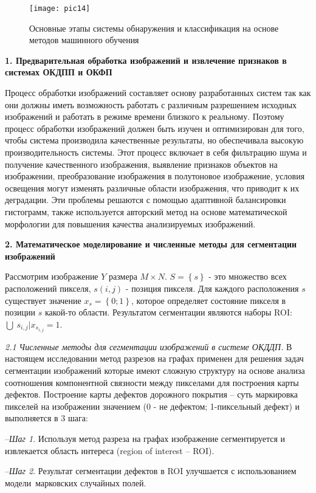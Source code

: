 \begin{figure}[ht!]
\centering
\texttt{[image: pic14]}
\caption{Основные этапы системы обнаружения и классификация на основе методов машинного обучения}
	\label{pic14}
	\end{figure}

\textbf{1. Предварительная обработка изображений и извлечение признаков в системах ОКДПП и ОКФП}

Процесс обработки изображений составляет основу разработанных систем так как они должны иметь возможность работать с различным разрешением исходных изображений и работать в режиме времени близкого к реальному. Поэтому процесс обработки изображений должен быть изучен и оптимизирован для того, чтобы система производила качественные результаты, но обеспечивала высокую производительность системы. Этот процесс включает в себя фильтрацию шума и получение качественного изображения, выявление признаков объектов на изображении, преобразование изображения в полутоновое изображение, условия освещения могут изменять различные области изображения, что приводит к их деградации. Эти проблемы решаются с помощью адаптивной балансировки гистограмм, также используется авторский метод на основе математической морфологии для повышения качества анализируемых изображений.

\textbf{2. Математическое моделирование и численные методы для сегментации изображений}

Рассмотрим изображение $Y$ размера $M \times N$. $S = \left\{s\right\}$ - это множество всех расположений пикселя, $s \left(i, j\right)$ - позиция пикселя. Для каждого расположения $s$ существует значение $x_s=\left\{0;1\right\}$, которое определяет состояние пикселя в позиции $s$ какой-то области. Результатом сегментации являются наборы ROI: $\bigcup\ s_{i,j} | x_{s_{i,j}}=1$.

\textit{2.1 Численные методы для сегментации изображений в системе ОКДДП.} В настоящем исследовании метод разрезов на графах применен для решения задач сегментации изображений которые имеют сложную структуру на основе анализа соотношения компонентной связности между пикселами для построения карты дефектов. Построение карты дефектов дорожного покрытия -- суть маркировка пикселей на изображении значением (0 - не дефектом; 1-пиксельный дефект) и выполняется в 3 шага:

--\textit{Шаг 1}. Используя метод разреза на графах изображение сегментируется и извлекается область интереса (region of interest -- ROI).

--\textit{Шаг 2}. Результат сегментации дефектов в ROI улучшается с использованием модели марковских случайных полей.

